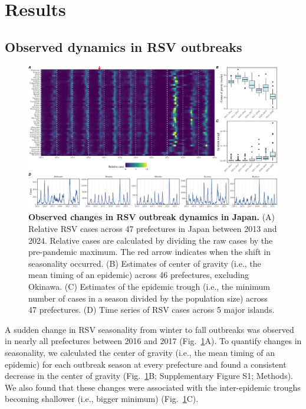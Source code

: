 \documentclass[12pt]{article}
\newcommand{\fref}[1]{Fig.~\ref{fig:#1}}
\begin{document}
\section*{Results}

\subsection*{Observed dynamics in RSV outbreaks}

\begin{figure}[!th]
\includegraphics[width=\textwidth]{../figure/figure1.pdf}
\caption{
\textbf{Observed changes in RSV outbreak dynamics in Japan.}
(A) Relative RSV cases across 47 prefectures in Japan between 2013 and 2024.
Relative cases are calculated by dividing the raw cases by the pre-pandemic maximum.
The red arrow indicates when the shift in seasonality occurred.
(B) Estimates of center of gravity (i.e., the mean timing of an epidemic) across 46 prefectures, excluding Okinawa.
(C) Estimates of the epidemic trough (i.e., the minimum number of cases in a season divided by the population size) across 47 prefectures.
(D) Time series of RSV cases across 5 major islands.
}
\label{fig:fig1}
\end{figure}

A sudden change in RSV seasonality from winter to fall outbreaks was observed in nearly all prefectures between 2016 and 2017 (\fref{fig1}A).
To quantify changes in seasonality, we calculated the center of gravity (i.e., the mean timing of an epidemic) for each outbreak season at every prefecture and found a consistent decrease in the center of gravity (\fref{fig1}B; Supplementary Figure S1; Methods).
We also found that these changes were associated with the inter-epidemic troughs becoming shallower (i.e., bigger minimum) (\fref{fig1}C).
\end{document}
